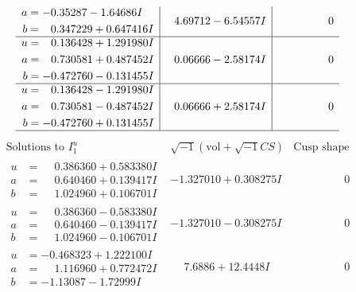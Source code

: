 \documentclass[1p]{elsarticle_modified}
\theoremstyle{definition}
\newcommand{\I}{\sqrt{-1}}
\begin{document}
$$\begin{array}{c|c|c}
\begin{aligned}
a &= -0.35287 - 1.64686 I \\
b &= \phantom{-}0.347229 + 0.647416 I\end{aligned}
 & \phantom{-}4.69712 - 6.54557 I & \phantom{-0.000000 } 0 \\ \hline\begin{aligned}
u &= \phantom{-}0.136428 + 1.291980 I \\
a &= \phantom{-}0.730581 + 0.487452 I \\
b &= -0.472760 - 0.131455 I\end{aligned}
 & \phantom{-}0.06666 - 2.58174 I & \phantom{-0.000000 } 0 \\ \hline\begin{aligned}
u &= \phantom{-}0.136428 - 1.291980 I \\
a &= \phantom{-}0.730581 - 0.487452 I \\
b &= -0.472760 + 0.131455 I\end{aligned}
 & \phantom{-}0.06666 + 2.58174 I & \phantom{-0.000000 } 0\\
 \hline 
 \end{array}$$\newpage$$\begin{array}{c|c|c}  
\text{Solutions to }I^u_{1}& \I (\text{vol} + \sqrt{-1}CS) & \text{Cusp shape}\\
 \hline 
\begin{aligned}
u &= \phantom{-}0.386360 + 0.583380 I \\
a &= \phantom{-}0.640460 + 0.139417 I \\
b &= \phantom{-}1.024960 + 0.106701 I\end{aligned}
 & -1.327010 + 0.308275 I & \phantom{-0.000000 } 0 \\ \hline\begin{aligned}
u &= \phantom{-}0.386360 - 0.583380 I \\
a &= \phantom{-}0.640460 - 0.139417 I \\
b &= \phantom{-}1.024960 - 0.106701 I\end{aligned}
 & -1.327010 - 0.308275 I & \phantom{-0.000000 } 0 \\ \hline\begin{aligned}
u &= -0.468323 + 1.222100 I \\
a &= \phantom{-}1.116960 + 0.772472 I \\
b &= -1.13087 - 1.72999 I\end{aligned}
 & \phantom{-}7.6886 + 12.4448 I & \phantom{-0.000000 } 0 \\ \hline\begin{aligned}

\end{aligned}
\end{array}$$
\end{document}
